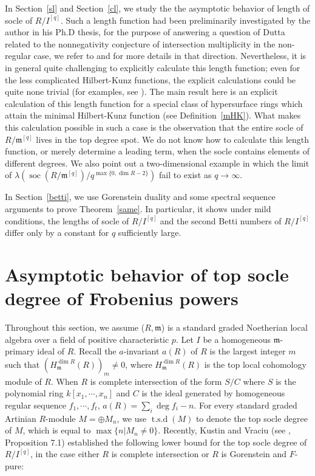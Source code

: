 \documentclass[draft]{amsart}
\theoremstyle{definition}
\numberwithin{equation}{theorem}
\begin{document}
In Section~\ref{sl} and Section~\ref{cl}, we study the the asymptotic behavior of length of socle of $R/I^{[q]}$. Such a length function had been preliminarily investigated by the author in his Ph.D thesis, for the purpose of answering a question of Dutta related to the nonnegativity conjecture of intersection multiplicity in the non-regular case, we refer to \cite{D} and \cite{L} for more details in that direction. Nevertheless, it is in general quite challenging to explicitly calculate this length function; even for the less complicated Hilbert-Kunz functions, the explicit calculations could be quite none trivial (for examples, see \cite{HM}).  The main result here is an explicit calculation  of this length function for a special class of hypersurface rings which attain the minimal Hilbert-Kunz function (see Definition~\ref{mHK}). What makes this calculation possible in such a case is the observation that the entire socle of $R/{\mathfrak{m}}^{[q]}$ lives in the top degree spot. We do not know how to calculate this length function, or merely determine a leading term,  when the socle contains elements of different degrees. We also point out a two-dimensional example in which the limit of ${\lambda} ({\operatorname{soc}}(R/{\mathfrak{m}}^{[q]})/ q^{\max\{0, \dim R-2\}})$ fail to exist as $q \to {{\infty}}$.

In Section~\ref{betti}, we use Gorenstein duality and some spectral sequence arguments to prove Theorem~\ref{same}. In particular, it shows under mild conditions, the lengths of socle of $R/I^{[q]}$ and the second Betti numbers of $R/I^{[q]}$ differ only by a constant for $q$ sufficiently large.
\section{Asymptotic behavior of top socle degree of Frobenius powers}\label{AB-tsd}

Throughout this section, we assume ($R, {\mathfrak{m}}$) is a standard graded Noetherian local algebra over a field of positive characteristic $p$. Let $I$ be a homogeneous ${\mathfrak{m}}$-primary ideal  of $R$. Recall the $a$-invariant $a(R)$ of $R$ is the largest integer $m$ such that $(H_{{\mathfrak{m}}}^{\dim R}(R))_m\neq 0$, where $H_{{\mathfrak{m}}}^{\dim R}(R)$ is the top local cohomology module of $R$. When $R$ is complete intersection of the form $S/C$ where $S$ is the polynomial ring $k[x_1,\cdots, x_n]$ and $C$ is the ideal generated by homogeneous regular sequence $f_1, \cdots, f_t$, $a(R)=\sum_i \deg f_i -n$. For every standard graded Artinian $R$-module $M=\oplus M_n$, we use ${\operatorname{t.s.d}}( M)$ to denote the top socle degree of $M$, which is equal to $\max \{n| M_n \neq 0\}$.  Recently, Kustin and Vraciu (see \cite{KV}, Proposition 7.1) established the following lower bound for the top socle degree of $R/I^{[q]}$, in the case either $R$ is complete intersection or $R$ is Gorenstein and $F$-pure:
\end{document}
